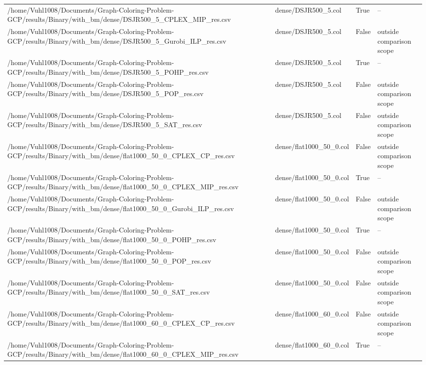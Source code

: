 \begin{table}[htbp]
\begin{tabular}{llll}
/home/Vuhl1008/Documents/Graph-Coloring-Problem-GCP/results/Binary/with\_bm/dense/DSJR500\_5\_CPLEX\_MIP\_res.csv & dense/DSJR500\_5.col & True & -- \\
/home/Vuhl1008/Documents/Graph-Coloring-Problem-GCP/results/Binary/with\_bm/dense/DSJR500\_5\_Gurobi\_ILP\_res.csv & dense/DSJR500\_5.col & False & outside comparison scope \\
/home/Vuhl1008/Documents/Graph-Coloring-Problem-GCP/results/Binary/with\_bm/dense/DSJR500\_5\_POHP\_res.csv & dense/DSJR500\_5.col & True & -- \\
/home/Vuhl1008/Documents/Graph-Coloring-Problem-GCP/results/Binary/with\_bm/dense/DSJR500\_5\_POP\_res.csv & dense/DSJR500\_5.col & False & outside comparison scope \\
/home/Vuhl1008/Documents/Graph-Coloring-Problem-GCP/results/Binary/with\_bm/dense/DSJR500\_5\_SAT\_res.csv & dense/DSJR500\_5.col & False & outside comparison scope \\
/home/Vuhl1008/Documents/Graph-Coloring-Problem-GCP/results/Binary/with\_bm/dense/flat1000\_50\_0\_CPLEX\_CP\_res.csv & dense/flat1000\_50\_0.col & False & outside comparison scope \\
/home/Vuhl1008/Documents/Graph-Coloring-Problem-GCP/results/Binary/with\_bm/dense/flat1000\_50\_0\_CPLEX\_MIP\_res.csv & dense/flat1000\_50\_0.col & True & -- \\
/home/Vuhl1008/Documents/Graph-Coloring-Problem-GCP/results/Binary/with\_bm/dense/flat1000\_50\_0\_Gurobi\_ILP\_res.csv & dense/flat1000\_50\_0.col & False & outside comparison scope \\
/home/Vuhl1008/Documents/Graph-Coloring-Problem-GCP/results/Binary/with\_bm/dense/flat1000\_50\_0\_POHP\_res.csv & dense/flat1000\_50\_0.col & True & -- \\
/home/Vuhl1008/Documents/Graph-Coloring-Problem-GCP/results/Binary/with\_bm/dense/flat1000\_50\_0\_POP\_res.csv & dense/flat1000\_50\_0.col & False & outside comparison scope \\
/home/Vuhl1008/Documents/Graph-Coloring-Problem-GCP/results/Binary/with\_bm/dense/flat1000\_50\_0\_SAT\_res.csv & dense/flat1000\_50\_0.col & False & outside comparison scope \\
/home/Vuhl1008/Documents/Graph-Coloring-Problem-GCP/results/Binary/with\_bm/dense/flat1000\_60\_0\_CPLEX\_CP\_res.csv & dense/flat1000\_60\_0.col & False & outside comparison scope \\
/home/Vuhl1008/Documents/Graph-Coloring-Problem-GCP/results/Binary/with\_bm/dense/flat1000\_60\_0\_CPLEX\_MIP\_res.csv & dense/flat1000\_60\_0.col & True & -- \\

\end{tabular}
\end{table}
